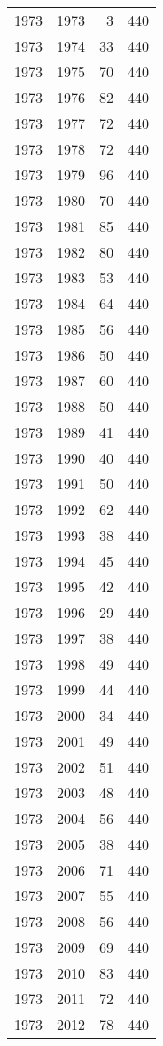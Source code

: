 \documentclass[
  11pt,
  letterpaper,
  DIV=11,
  numbers=noendperiod,
  twoside]{scrartcl}
\begin{document}
\begin{longtable}[]{@{}rrrr@{}}
1973 & 1973 & 3 & 440 \\
1973 & 1974 & 33 & 440 \\
1973 & 1975 & 70 & 440 \\
1973 & 1976 & 82 & 440 \\
1973 & 1977 & 72 & 440 \\
1973 & 1978 & 72 & 440 \\
1973 & 1979 & 96 & 440 \\
1973 & 1980 & 70 & 440 \\
1973 & 1981 & 85 & 440 \\
1973 & 1982 & 80 & 440 \\
1973 & 1983 & 53 & 440 \\
1973 & 1984 & 64 & 440 \\
1973 & 1985 & 56 & 440 \\
1973 & 1986 & 50 & 440 \\
1973 & 1987 & 60 & 440 \\
1973 & 1988 & 50 & 440 \\
1973 & 1989 & 41 & 440 \\
1973 & 1990 & 40 & 440 \\
1973 & 1991 & 50 & 440 \\
1973 & 1992 & 62 & 440 \\
1973 & 1993 & 38 & 440 \\
1973 & 1994 & 45 & 440 \\
1973 & 1995 & 42 & 440 \\
1973 & 1996 & 29 & 440 \\
1973 & 1997 & 38 & 440 \\
1973 & 1998 & 49 & 440 \\
1973 & 1999 & 44 & 440 \\
1973 & 2000 & 34 & 440 \\
1973 & 2001 & 49 & 440 \\
1973 & 2002 & 51 & 440 \\
1973 & 2003 & 48 & 440 \\
1973 & 2004 & 56 & 440 \\
1973 & 2005 & 38 & 440 \\
1973 & 2006 & 71 & 440 \\
1973 & 2007 & 55 & 440 \\
1973 & 2008 & 56 & 440 \\
1973 & 2009 & 69 & 440 \\
1973 & 2010 & 83 & 440 \\
1973 & 2011 & 72 & 440 \\
1973 & 2012 & 78 & 440 \\

\end{longtable}
\end{document}
